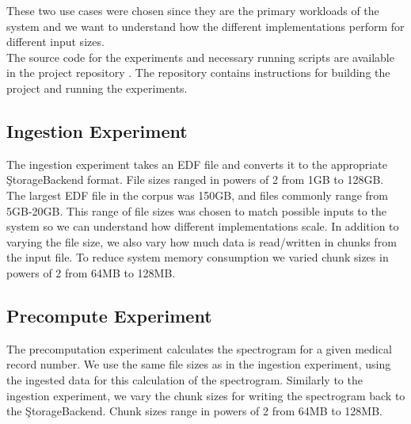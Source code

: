 These two use cases were chosen since they are the primary workloads of the
system and we want to understand how the different implementations perform for
different input sizes.\\

The source code for the experiments and necessary running scripts are available
in the project repository \cite{eeg-toolkit}. The repository contains
instructions for building the project and running the experiments.

\subsection{Ingestion Experiment}\label{ch2:ingestion-exp}
The ingestion experiment takes an EDF file and converts it to the appropriate
\c{StorageBackend} format. File sizes ranged in powers of 2 from 1GB to 128GB.
The largest EDF file in the corpus was 150GB, and files commonly range from
5GB-20GB. This range of file sizes was chosen to match possible inputs to the
system so we can understand how different implementations scale. In addition to
varying the file size, we also vary how much data is read/written in chunks
from the input file. To reduce system memory consumption we varied chunk sizes
in powers of 2 from 64MB to 128MB.

\subsection{Precompute Experiment}\label{ch2:precompute-exp}
The precomputation experiment calculates the spectrogram for a given medical
record number. We use the same file sizes as in the ingestion experiment, using
the ingested data for this calculation of the spectrogram. Similarly to the
ingestion experiment, we vary the chunk sizes for writing the spectrogram back
to the \c{StorageBackend}. Chunk sizes range in powers of 2 from 64MB to 128MB.
